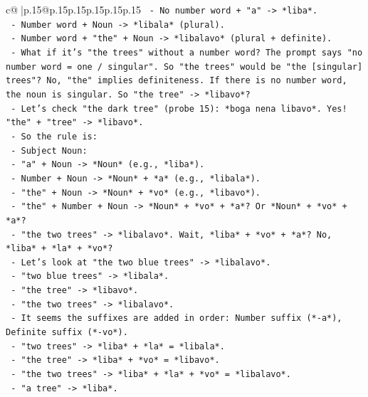 \documentclass{article}
\begin{document}
{\begin{supertabular}{c@{$\;$}|p{.15\linewidth}@{}p{.15\linewidth}p{.15\linewidth}p{.15\linewidth}p{.15\linewidth}p{.15\linewidth}}
{{{\texttt{      {-} No number word + "a" {-}> *liba*.} \\
\texttt{      {-} Number word + Noun {-}> *libala* (plural).} \\
\texttt{      {-} Number word + "the" + Noun {-}> *libalavo* (plural + definite).} \\
\texttt{      {-} What if it's "the trees" without a number word? The prompt says "no number word = one / singular". So "the trees" would be "the {[}singular{]} trees"? No, "the" implies definiteness. If there is no number word, the noun is singular. So "the tree" {-}> *libavo*?} \\
\texttt{      {-} Let's check "the dark tree" (probe 15): *boga nena libavo*. Yes! "the" + "tree" {-}> *libavo*.} \\
\texttt{      {-} So the rule is:} \\
\texttt{        {-} Subject Noun:} \\
\texttt{          {-} "a" + Noun {-}> *Noun* (e.g., *liba*).} \\
\texttt{          {-} Number + Noun {-}> *Noun* + *a* (e.g., *libala*).} \\
\texttt{          {-} "the" + Noun {-}> *Noun* + *vo* (e.g., *libavo*).} \\
\texttt{          {-} "the" + Number + Noun {-}> *Noun* + *vo* + *a*? Or *Noun* + *vo* + *a*?} \\
\texttt{            {-} "the two trees" {-}> *libalavo*. Wait, *liba* + *vo* + *a*? No, *liba* + *la* + *vo*?} \\
\texttt{            {-} Let's look at "the two blue trees" {-}> *libalavo*.} \\
\texttt{            {-} "two blue trees" {-}> *libala*.} \\
\texttt{            {-} "the tree" {-}> *libavo*.} \\
\texttt{            {-} "the two trees" {-}> *libalavo*.} \\
\texttt{            {-} It seems the suffixes are added in order: Number suffix (*{-}a*), Definite suffix (*{-}vo*).} \\
\texttt{            {-} "two trees" {-}> *liba* + *la* = *libala*.} \\
\texttt{            {-} "the tree" {-}> *liba* + *vo* = *libavo*.} \\
\texttt{            {-} "the two trees" {-}> *liba* + *la* + *vo* = *libalavo*.} \\
\texttt{            {-} "a tree" {-}> *liba*.} \\
}}}
\end{supertabular}}
\end{document}
